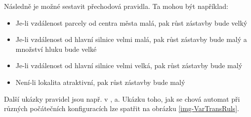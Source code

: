 \documentclass[a4paper,10pt]{article}
\begin{document}
Následně je možné sestavit přechodová pravidla. Ta mohou být například:
\begin{itemize}
 \item Je-li vzdálenost parcely od centra města malá, pak růst zástavby bude velký
 \item Je-li vzdálenost od hlavní silnice velmi malá, pak růst zástavby bude malý a množství hluku bude velké
 \item Je-li vzdálenost od hlavní silnice velmi velká, pak růst zástavby bude malý
 \item Není-li lokalita atraktivní, pak růst zástavby bude malý
\end{itemize}

Další ukázky pravidel jsou např. v \cite{Ahm+-CalFuzCelAutModUrbDynSauAr}, \cite{ManHatPra-FuzzCellAutModAppAccUrbGroDynLingTerm} a\cite{LiuPhi-DevCelAutModUrbGroIncFuzSetApp}. Ukázku toho, jak se chová automat při různých počátečních konfiguracích lze spatřit na obrázku \ref{img-VarTransRuls}. 
\end{document}
